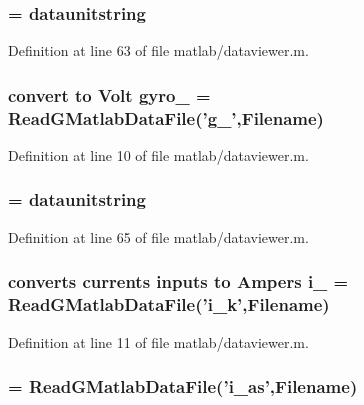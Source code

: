 \subsubsection[{gyro\_\-1\_\-unitstring}]{ = {\bf dataunitstring}}\label{matlab_2dataviewer_8m_a5618aca5203ec45dfc63c0513816d07b}


Definition at line 63 of file matlab/dataviewer.m.
\subsubsection[{gyro\_\-2}]{\setlength{\rightskip}{0pt plus 5cm}convert to Volt {\bf gyro\_} = ReadGMatlabDataFile('g\_',{\bf Filename})}\label{matlab_2dataviewer_8m_af4f547b37792776499225c3278e381a2}


Definition at line 10 of file matlab/dataviewer.m.
\subsubsection[{gyro\_\-2\_\-unitstring}]{ = {\bf dataunitstring}}\label{matlab_2dataviewer_8m_ae70f5ff07f876d8543ff36dae7a34cbf}


Definition at line 65 of file matlab/dataviewer.m.
\subsubsection[{i\_\-1}]{\setlength{\rightskip}{0pt plus 5cm}converts currents inputs to Ampers {\bf i\_} = ReadGMatlabDataFile('{\bf i\_\-k}',{\bf Filename})}\label{matlab_2dataviewer_8m_af9e7d4a08f65a50f2fca548e896e70c5}


Definition at line 11 of file matlab/dataviewer.m.
\subsubsection[{i\_\-2}]{ = ReadGMatlabDataFile('{\bf i\_\-as}',{\bf Filename})}\label{matlab_2dataviewer_8m_a0dc010b9e612b60013fbb0684b755b6d}


